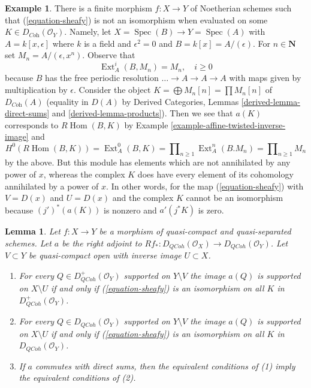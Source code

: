 \documentclass{stacks-project}
\theoremstyle{plain}
\newtheorem{lemma}[subsection]{Lemma}
\theoremstyle{definition}
\newtheorem{example}[subsection]{Example}
\theoremstyle{remark}
\numberwithin{equation}{subsection}
\def\Spec{\mathop{\mathrm{Spec}}}
\def\Hom{\mathop{\mathrm{Hom}}\nolimits}
\def\Ext{\mathop{\mathrm{Ext}}\nolimits}
\def\QCoh{\mathit{QCoh}}
\begin{document}
\begin{example}
\label{example-not-supported-on-inverse-image}
There is a finite morphism $f : X \to Y$ of Noetherian schemes
such that (\ref{equation-sheafy}) is not an isomorphism
when evaluated on some
$K \in D_{\textit{Coh}}(\mathcal{O}_Y)$.
Namely, let $X = \Spec(B) \to Y = \Spec(A)$ with
$A = k[x, \epsilon]$ where $k$ is a field and $\epsilon^2 = 0$ and
$B = k[x] = A/(\epsilon)$. For $n \in \mathbf{N}$ set
$M_n = A/(\epsilon, x^n)$. Observe that
$$
\Ext^i_A(B, M_n) = M_n,\quad i \geq 0
$$
because $B$ has the free periodic resolution
$\ldots \to A \to A \to A$ with maps given by multiplication by $\epsilon$.
Consider the object
$K = \bigoplus M_n[n] = \prod M_n[n]$
of $D_{\textit{Coh}}(A)$ (equality in $D(A)$ by
Derived Categories, Lemmas \ref{derived-lemma-direct-sums} and
\ref{derived-lemma-products}). Then we see that $a(K)$ corresponds
to $R\Hom(B, K)$ by Example \ref{example-affine-twisted-inverse-image} and
$$
H^0(R\Hom(B, K)) = \Ext^0_A(B, K) =
\prod\nolimits_{n \geq 1} \Ext^n_A(B. M_n) = 
\prod\nolimits_{n \geq 1} M_n
$$
by the above. But this module has elements which are not
annihilated by any power of $x$, whereas the complex $K$
does have every element of its cohomology annihilated by
a power of $x$. In other words, for the map (\ref{equation-sheafy})
with $V = D(x)$ and $U = D(x)$ and the complex $K$ cannot
be an isomorphism because $(j')^*(a(K))$ is nonzero and
$a'(j^*K)$ is zero.
\end{example}

\begin{lemma}
\label{lemma-when-sheafy}
Let $f : X \to Y$ be a morphism of quasi-compact and quasi-separated
schemes. Let $a$ be the right adjoint to
$Rf_* : D_\QCoh(\mathcal{O}_X) \to D_\QCoh(\mathcal{O}_Y)$.
Let $V \subset Y$ be quasi-compact open with inverse image $U \subset X$.
\begin{enumerate}
\item For every $Q \in D_\QCoh^+(\mathcal{O}_Y)$
supported on $Y \setminus V$ the image $a(Q)$ is supported on
$X \setminus U$ if and only if (\ref{equation-sheafy})
is an isomorphism on all $K$ in $D_\QCoh^+(\mathcal{O}_Y)$.
\item For every $Q \in D_\QCoh(\mathcal{O}_Y)$
supported on $Y \setminus V$ the image $a(Q)$ is supported on
$X \setminus U$ if and only if (\ref{equation-sheafy})
is an isomorphism on all $K$ in $D_\QCoh(\mathcal{O}_Y)$.
\item If $a$ commutes with direct sums, then the equivalent conditions of
(1) imply the equivalent conditions of (2).
\end{enumerate}
\end{lemma}
\end{document}
